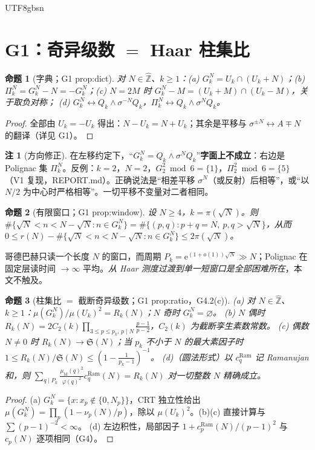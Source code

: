 \documentclass[11pt,a4paper]{article}
\newcommand{\Zhat}{\widehat{\mathbb Z}}
\newcommand{\Haar}{\mu}
\newcommand{\Sing}{\mathfrak S}
\newcommand{\status}[1]{\par\noindent\fbox{\textbf{状态：#1}}\par\smallskip}
\newcommand{\Mob}{\mu_{\mathrm{M}}}    %
\newcommand{\ee}{\mathrm e}
\newcommand{\Ram}{c^{\mathrm{Ram}}}    %
\theoremstyle{plain}
\newtheorem{prop}{命题}
\theoremstyle{definition}
\newtheorem{rem}[lem]{注}
\begin{document}
\begin{CJK}{UTF8}{gbsn}
\section{G1：奇异级数 $=$ Haar 柱集比}\label{paper:sec:G1}

\begin{prop}[字典；G1 prop:dict]\label{paper:prop:dict}
对 $N\in\Zhat$、$k\ge1$：(a) $G_k^N=U_k\cap(U_k+N)$；(b) $\Pi_k^N=G_k^N-N=-G_k^N$；(c) $N=2M$ 时 $G_k^N-M=(U_k+M)\cap(U_k-M)$，关于取负对称；
(d) $G_k^N\leftrightarrow Q_k\wedge\sigma^{-N}Q_k$，$\Pi_k^N\leftrightarrow Q_k\wedge\sigma^NQ_k$。
\end{prop}
\status{已证}
\begin{proof}
全部由 $U_k=-U_k$ 得出：$N-U_k=N+U_k$；其余是平移与 $\sigma^{\pm N}\leftrightarrow A\mp N$ 的翻译（详见 G1）。
\end{proof}

\begin{rem}[方向修正]\label{paper:rem:direction}
在左移约定下，“$G_k^N=Q_k\wedge\sigma^NQ_k$”\textbf{字面上不成立}：右边是 Polignac 集 $\Pi_k^N$。反例：$k=2$，$N=2$，$G_2^2\bmod6=\{1\}$，$\Pi_2^2\bmod6=\{5\}$
（V1 复现，REPORT.md）。正确说法是“相差平移 $\sigma^N$（或反射）后相等”，或“以 $N/2$ 为中心时严格相等”。一切平移不变量对二者相同。
\end{rem}

\begin{prop}[有限窗口；G1 prop:window]\label{paper:prop:window}
设 $N\ge4$，$k=\pi(\sqrt N)$。则 $\#\{\sqrt N<n<N-\sqrt N:n\in G_k^N\}=\#\{(p,q):p+q=N,\ p,q>\sqrt N\}$，从而
$0\le r(N)-\#\{\sqrt N<n<N-\sqrt N:n\in G_k^N\}\le2\pi(\sqrt N)$。
\end{prop}
\status{已证}
\noindent 哥德巴赫只读一个长度 $N$ 的窗口，而周期 $P_k=\ee^{(1+o(1))\sqrt N}\gg N$；Polignac 在固定层读时间 $\to\infty$ 平均。\emph{从 Haar 测度过渡到单一短窗口是全部困难所在}，本文不触及。

\begin{prop}[柱集比 $=$ 截断奇异级数；G1 prop:ratio，G4.2(c)]\label{paper:prop:ratio}
(a) 对 $N\in\Zhat$、$k\ge1$：$\Haar(G_k^N)/\Haar(U_k)^2=R_k(N)$；$N$ 奇时 $G_k^N=\varnothing$。
(b) $N$ 偶时 $R_k(N)=2C_2(k)\prod_{3\le p\le p_k,\,p\mid N}\frac{p-1}{p-2}$，$C_2(k)$ 为截断孪生素数常数。
(c) 偶数 $N\ne0$ 时 $R_k(N)\to\Sing(N)$；当 $p_k$ 不小于 $N$ 的最大素因子时 $1\le R_k(N)/\Sing(N)\le(1-\frac1{p_k-1})^{-1}$。
(d)（圆法形式）以 $\Ram_q$ 记 Ramanujan 和，则 $\sum_{q\mid P_k}\frac{\Mob(q)^2}{\varphi(q)^2}\Ram_q(N)=R_k(N)$ 对一切整数 $N$ 精确成立。
\end{prop}
\status{已证}
\begin{proof}
(a) $G_k^N=\{x:x_p\notin\{0,N_p\}\}$，CRT 独立性给出 $\Haar(G_k^N)=\prod_p(1-\nu_p(N)/p)$，除以 $\Haar(U_k)^2$。(b)(c) 直接计算与 $\sum(p-1)^{-2}<\infty$。
(d) 左边积性，局部因子 $1+\Ram_p(N)/(p-1)^2$ 与 $c_p(N)$ 逐项相同（G4）。
\end{proof}


\end{CJK}
\end{document}

